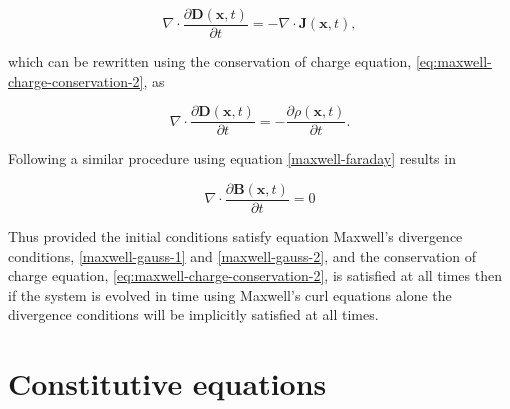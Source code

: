 $$
\nabla \cdot \frac{\partial \mathbf{D}(\mathbf{x}, t)}{\partial t} = - \nabla \cdot \mathbf{J}(\mathbf{x},t),
$$

which can be rewritten using the conservation of charge equation, \ref{eq:maxwell-charge-conservation-2}, as

$$
\nabla \cdot \frac{\partial \mathbf{D}(\mathbf{x}, t)}{\partial t} = - \frac{\partial \rho (\mathbf{x},t)}{\partial t}.
$$

Following a similar procedure using equation \ref{maxwell-faraday} results in

$$
\nabla \cdot \frac{\partial \mathbf{B}(\mathbf{x}, t)}{\partial t} = 0
$$

Thus provided the initial conditions satisfy equation Maxwell's divergence conditions, \ref{maxwell-gauss-1} and \ref{maxwell-gauss-2}, and the conservation of charge equation, \ref{eq:maxwell-charge-conservation-2}, is satisfied at all times then if the system is evolved in time using Maxwell's curl equations alone the divergence conditions will be implicitly satisfied at all times.

\section{Constitutive equations}

